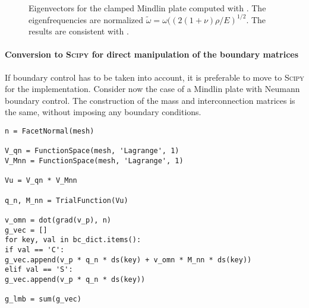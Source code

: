\begin{figure*}[tb]
	\centering
	\hfil
	 \\
	\hfil
	\caption{Eigenvectors for the clamped Mindlin plate computed with \firedrake. The eigenfrequencies are normalized $\widetilde{\omega} = \omega((2(1+\nu)\rho/E)^{1/2}$. The results are consistent with \cite{duran1999approximation}.}
	\label{fig:EigMin}
\end{figure*}

\paragraph{Conversion to \textsc{Scipy} for direct manipulation of the boundary matrices}
If boundary control has to be taken into account, it is preferable to move to \textsc{Scipy} for the implementation. Consider now the case of a Mindlin plate with Neumann boundary control. The construction of the mass and interconnection matrices is the same, without imposing any boundary conditions.

\begin{tcolorbox}[title = Eigenvalues computation in  \firedrake, coltitle=black, breakable, size=fbox, boxrule=1pt, pad at break*=1mm, colframe=cyan, enlarge top by=0.25em, enlarge bottom by=0.5em]
\begin{Verbatim}[tabsize=4]
n = FacetNormal(mesh)

V_qn = FunctionSpace(mesh, 'Lagrange', 1)
V_Mnn = FunctionSpace(mesh, 'Lagrange', 1)

Vu = V_qn * V_Mnn

q_n, M_nn = TrialFunction(Vu)

v_omn = dot(grad(v_p), n)
g_vec = []
for key, val in bc_dict.items():
if val == 'C':
g_vec.append(v_p * q_n * ds(key) + v_omn * M_nn * ds(key))
elif val == 'S':
g_vec.append(v_p * q_n * ds(key))

g_lmb = sum(g_vec)
\end{Verbatim}
\end{tcolorbox}


